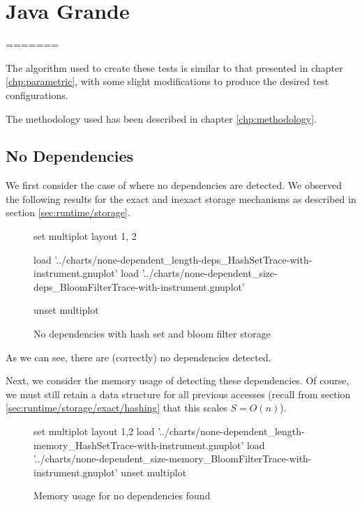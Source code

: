 \section{Java Grande} \label{sec:results/grande}

=======

The algorithm used to create these tests is similar to that presented in chapter \ref{chp:parametric}, with some slight modifications to produce the desired test configurations.

The methodology used has been described in chapter \ref{chp:methodology}.

	\subsection{No Dependencies} \label{sec:result/basic/no-dep}
	We first consider the case of where no dependencies are detected. We observed the following results for the exact and inexact storage mechanisms as described in section \ref{sec:runtime/storage}.
	
	\begin{figure}[H]
		\centering
		\begin{gnuplot}[terminal=pdf]
		set multiplot layout 1, 2
		
		load '../charts/none-dependent_length-deps_HashSetTrace-with-instrument.gnuplot'
		load '../charts/none-dependent_size-deps_BloomFilterTrace-with-instrument.gnuplot'
		
		unset multiplot
		\end{gnuplot}
		\label{chart:none-dependent-deps-comparison}
		\caption{No dependencies with hash set and bloom filter storage}
	\end{figure}
	
	As we can see, there are (correctly) no dependencies detected.
	
	Next, we consider the memory usage of detecting these dependencies. Of course, we must still retain a data structure for all previous accesses (recall from section \ref{sec:runtime/storage/exact/hashing} that this scales $S=O(n)$).
	
	\begin{figure}[H]
		\centering
		\begin{gnuplot}[terminal=pdf]
			set multiplot layout 1,2
				load '../charts/none-dependent_length-memory_HashSetTrace-with-instrument.gnuplot'
				load '../charts/none-dependent_size-memory_BloomFilterTrace-with-instrument.gnuplot'
			unset multiplot
		\end{gnuplot}
		\caption{Memory usage for no dependencies found}
		\label{chart:none-dependent-memory-comparison}
	\end{figure}
	
